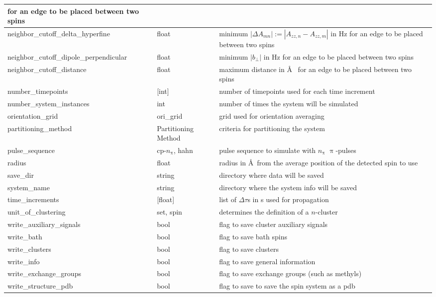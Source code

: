 \documentclass{book}
\begin{document}
\begin{center}
\begin{tabular}{| m{7cm} | m{2cm}| m{7cm} |}
 for an edge to be placed between two spins\\
 \hline 
 neighbor\_cutoff\_delta\_hyperfine & float & 
 minimum $|\Delta A_{mn}| := |A_{zz,n} - A_{zz,m}|$ in Hz 
 for an edge to be placed between two spins\\
 \hline 
 neighbor\_cutoff\_dipole\_perpendicular & float & 
 minimum $|b_{\perp}|$ in Hz 
 for an edge to be placed between two spins\\
 \hline 
 neighbor\_cutoff\_distance & float & 
 maximum distance in \AA~ 
 for an edge to be placed between two spins\\
 \hline 
 number\_timepoints  & [int] & 
 number of timepoints used for each time increment\\ 
 \hline 
 number\_system\_instances  & int & 
 number of times the system will be simulated\\ 
 \hline 
 orientation\_grid  & ori\_grid & grid used for orientation averaging\\ 
 \hline 
 partitioning\_method & Partitioning Method & 
 criteria for partitioning the system\\
 \hline 
 pulse\_sequence & cp-$n_{\uppi}$, hahn & 
 pulse sequence to simulate with $n_{\uppi}$ $\uppi$-pulses\\
 \hline 
 radius & float & 
 radius in \AA~from the average position of the detected spin to use\\
 \hline 
 save\_dir & string & 
 directory where data will be saved\\
 \hline 
 system\_name & string & 
 directory where the system info will be saved\\
 \hline 
 time\_increments  & [float] & 
 list of $\Delta \tau$s in s used for propagation\\ 
 \hline 
 unit\_of\_clustering & set, spin & 
 determines the definition of a $n$-cluster\\
 \hline 
 write\_auxiliary\_signals & bool & 
 flag to save cluster auxiliary signals\\
 \hline 
 write\_bath & bool & 
 flag to save bath spins\\
 \hline 
 write\_clusters & bool & 
 flag to save clusters\\
 \hline 
 write\_info & bool & 
 flag to save general information\\
 \hline 
 write\_exchange\_groups & bool & 
 flag to save exchange groups (such as methyls)\\
 \hline 
 write\_structure\_pdb & bool & 
 flag to save to save the spin system as a pdb\\
 \hline 
\end{tabular}
\end{center} 
\end{document}
